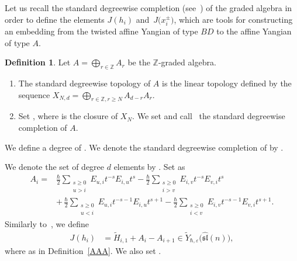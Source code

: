 \documentclass[pdftex]{sigma}
\numberwithin{equation}{section}
\theoremstyle{definition}
\newtheorem{Definition}[Theorem]{Definition}
\newcommand{\ve}{\varepsilon}
\begin{document}
Let us recall the standard degreewise completion (see~\cite[Section 1.3 ]{MNT}) of the graded algebra in order to define the elements $J(h_i)$ and~$J\bigl(x^\pm_i\bigr)$, which are tools for constructing an embedding from the twisted affine Yangian of type $BD$ to the affine Yangian of type $A$.
\begin{Definition}
Let $A=\bigoplus_{r\in\mathbb{Z}}A_r$ be the $\mathbb{Z}$-graded algebra.
\begin{enumerate}\itemsep=0pt
\item[$(1)$] The standard degreewise topology of $A$ is the linear topology defined by the sequence $X_{N,d}=\bigoplus_{r\in\mathbb{Z},r\geq N}A_{d-r}A_r$.

\item[$(2)$] Set ,
where  is the closure of $X_N$.
We set  and call~ the standard degreewise completion of $A$.
\end{enumerate}
\end{Definition}
We define a degree of . We denote the standard degreewise \mbox{completion} of \smash{$Y_{\hbar,\ve}\bigl(\widehat{\mathfrak{sl}}(n)\bigr)$} by \smash{$\widetilde{Y}_{\hbar,\ve}\bigl(\widehat{\mathfrak{sl}}(n)\bigr)$}.

We denote the set of degree $d$ elements by \smash{$Y_{\hbar,\ve}\bigl(\widehat{\mathfrak{sl}}(n)\bigr)_d$}. Set \smash{$A_i\in\widetilde{Y}_{\hbar,\ve}\bigl(\widehat{\mathfrak{sl}}(n)\bigr)$} as
\begin{align*}
A_i={}&\frac{\hbar}{2}\sum_{\substack{s\geq0\\u>i}}\limits E_{u,i}t^{-s}E_{i,u}t^s-\frac{\hbar}{2}\sum_{\substack{s\geq0\\i>v}}\limits E_{i,v}t^{-s}E_{v,i}t^s\\
&{+}\,\frac{\hbar}{2}\sum_{\substack{s\geq0\\u<i}}\limits E_{u,i}t^{-s-1}E_{i,u}t^{s+1}-\frac{\hbar}{2}\sum_{\substack{s\geq0\\i<v}}\limits E_{i,v}t^{-s-1}E_{v,i}t^{s+1}.
\end{align*}
Similarly to~\cite[Section~3]{GNW}, we define
\begin{align*}
J(h_i)&=\widetilde{H}_{i,1}+A_i-A_{i+1}\in \widetilde{Y}_{\hbar,\ve}\bigl(\widehat{\mathfrak{sl}}(n)\bigr),
\end{align*}
where  as in Definition~\ref{AAA}.
We also set .
\end{document}
